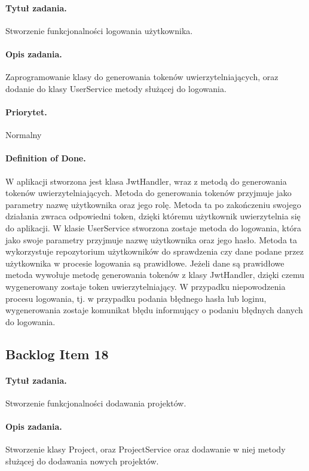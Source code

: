 \documentclass[a4paper]{article}
\begin{document}
\paragraph{Tytuł zadania.} Stworzenie funkcjonalności logowania użytkownika.
\paragraph{Opis zadania.} Zaprogramowanie klasy do generowania tokenów uwierzytelniających, oraz dodanie do klasy UserService metody służącej do logowania.
\paragraph{Priorytet.} Normalny
\paragraph{Definition of Done.} W aplikacji stworzona jest klasa JwtHandler, wraz z metodą do generowania tokenów uwierzytelniających. Metoda do generowania tokenów przyjmuje jako parametry nazwę użytkownika oraz jego rolę. Metoda ta po zakończeniu swojego działania zwraca odpowiedni token, dzięki któremu użytkownik uwierzytelnia się do aplikacji. W klasie UserService stworzona zostaje metoda do logowania, która jako swoje parametry przyjmuje nazwę użytkownika oraz jego hasło. Metoda ta wykorzystuje repozytorium użytkowników do sprawdzenia czy dane podane przez użytkownika w procesie logowania są prawidłowe. Jeżeli dane są prawidłowe metoda wywołuje metodę generowania tokenów z klasy JwtHandler, dzięki czemu wygenerowany zostaje token uwierzytelniający. W przypadku niepowodzenia procesu logowania, tj. w przypadku podania błędnego hasła lub loginu, wygenerowania zostaje komunikat błędu informujący o podaniu błędnych danych do logowania.

\subsection{Backlog Item 18} 
\paragraph{Tytuł zadania.}  Stworzenie funkcjonalności dodawania projektów.
\paragraph{Opis zadania.} Stworzenie klasy Project, oraz ProjectService oraz dodawanie w niej metody służącej do dodawania nowych projektów. 
\end{document}
